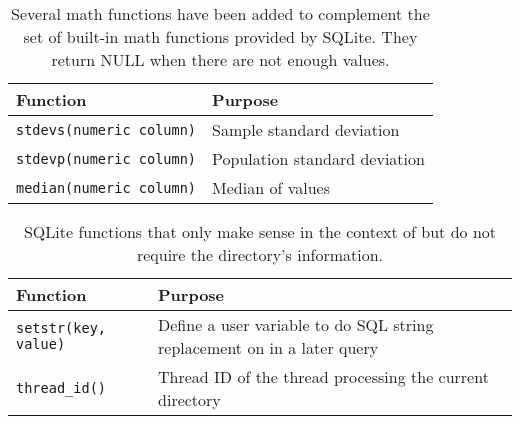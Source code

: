 \begin{table}[htb]
  \centering
  \caption{\label{tab:sqlmath}Several math functions have been added to complement the set of built-in math functions provided by SQLite. They return NULL when there are not enough values.}
  \begin{tabular}{| l | l |}
    \hline
    Function & Purpose \\
    \hline
    \texttt{stdevs(numeric column)} & Sample standard deviation \\
    \hline
    \texttt{stdevp(numeric column)} & Population standard deviation \\
    \hline
    \texttt{median(numeric column)} & Median of values \\
    \hline
  \end{tabular}
\end{table}

\begin{table}[htb]
  \centering
  \caption{SQLite functions that only make sense in the context of \gufiquery but do not require the directory's information.}
  \begin{tabular}{| l | l |}
    \hline
    Function & Purpose \\
    \hline
    \texttt{setstr(key, value)} & Define a user variable to do SQL string replacement on in a later query \\
    \hline
    \texttt{thread\_id()} & Thread ID of the thread processing the current directory \\
    \hline
  \end{tabular}
\end{table}

